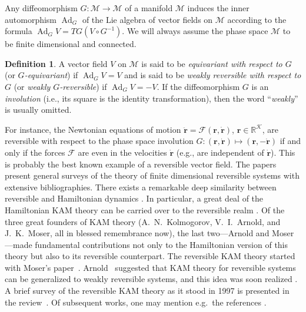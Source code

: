 \documentclass[12pt,reqno]{amsart}
\theoremstyle{definition}
\newtheorem{defn}{Definition}
\begin{document}
Any diffeomorphism $G:{\mathcal M}\to{\mathcal M}$ of a manifold ${\mathcal M}$ induces the inner
automorphism $\operatorname{Ad}_G$ of the Lie algebra of vector fields on ${\mathcal M}$ according to
the formula $\operatorname{Ad}_GV=TG(V\circ G^{-1})$. We will always assume the phase space
${\mathcal M}$ to be finite dimensional and connected.

\begin{defn}\label{defrev}
A vector field $V$ on ${\mathcal M}$ is said to be \emph{equivariant with respect to
$G$} (or \emph{$G$-equivariant}) if $\operatorname{Ad}_GV=V$ and is said to be \emph{weakly
reversible with respect to $G$} (or \emph{weakly $G$-reversible}) if
$\operatorname{Ad}_GV=-V$. If the diffeomorphism $G$ is an \emph{involution} (i.e., its
square is the identity transformation), then the word ``\emph{weakly}'' is
usually omitted.
\end{defn}

For instance, the Newtonian equations of motion
$\ddot{\mathbf r}={\mathcal F}({\mathbf r},\dot{\mathbf r})$, ${\mathbf r}\in{\mathbb R}^{\mathcal K}$, are reversible with
respect to the phase space involution
$G:({\mathbf r},\dot{\mathbf r})\mapsto({\mathbf r},-\dot{\mathbf r})$ if and only if the forces ${\mathcal F}$ are
even in the velocities $\dot{\mathbf r}$ (e.g., are independent of $\dot{\mathbf r}$).
This is probably the best known example of a reversible vector field. The
papers \cite{LR98,RQ92} present general surveys of the theory of finite
dimensional reversible systems with extensive bibliographies. There exists
a remarkable deep similarity between reversible and Hamiltonian dynamics
\cite{A84,AS86,LR98,RQ92,S86,S91}. In particular, a great deal of the
Hamiltonian KAM theory can be carried over to the reversible realm
\cite{AS86,BCHV09,BHN07,BH95,BHS96Gro,BHS96LNM,M67,M73,S86,S95Cha,S98,S06,S07DCDS,S07Stek}. Of the three great founders of KAM theory (A.~N.~Kolmogorov,
V.~I.~Arnold, and J.~K.~Moser, all in blessed remembrance now), the last
two---Arnold \cite{A84,AS86} and Moser \cite{M65,M67,M73}---made fundamental
contributions not only to the Hamiltonian version of this theory but also to
its reversible counterpart. The reversible KAM theory started with Moser's
paper~\cite{M65}. Arnold~\cite{A84} suggested that KAM theory for reversible
systems can be generalized to weakly reversible systems, and this idea was
soon realized \cite{AS86,S86}. A brief survey of the reversible KAM theory as
it stood in 1997 is presented in the review~\cite{S98}. Of subsequent works,
one may mention e.g.\ the references
\cite{BCHV09,BHN07,L01,S06,S07DCDS,S07Stek,S11,WX09,WXZ10,WZX11,W01,X04,Z08}.
\end{document}
